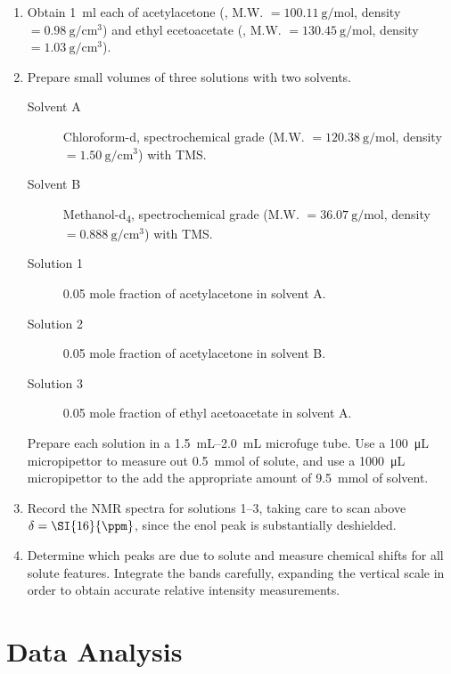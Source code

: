 \documentclass[nobib,nofonts,nols,nohyper,draft]{tufte-handout}
\begin{document}
\begin{enumerate}
	\item Obtain \SI{1}{\ml} each of acetylacetone (, M.W. \( = \SI{100.11}{\g\per\mol} \), density \( = \SI{0.98}{\g\per\cm\cubed} \)) and ethyl ecetoacetate (, M.W. \( = \SI{130.45}{\g\per\mol} \), density \( = \SI{1.03}{\g\per\cm\cubed} \)). 
	\item Prepare small volumes of three solutions with two solvents. 
	\begin{description}
		\item[Solvent A] Chloroform-d, spectrochemical grade (M.W. \( = \SI{120.38}{\g\per\mol} \), density \( = \SI{1.50}{\g\per\cm\cubed} \)) with TMS. 
		\item[Solvent B] Methanol-d\textsubscript{4}, spectrochemical grade (M.W. \( = \SI{36.07}{\g\per\mol} \), density \( = \SI{0.888}{\g\per\cm\cubed} \)) with TMS.
		\item[Solution 1] \num{0.05} mole fraction of acetylacetone in solvent A.
		\item[Solution 2] \num{0.05} mole fraction of acetylacetone in solvent B.
		\item[Solution 3] \num{0.05} mole fraction of ethyl acetoacetate in solvent A.
	\end{description}
	Prepare each solution in a \SIrange{1.5}{2.0}{\mL} microfuge tube. 
	Use a \SI{100}{\uL} micropipettor  to measure out \SI{0.5}{\milli\mole} of solute, and use a \SI{1000}{\uL} micropipettor to the add the appropriate amount of \SI{9.5}{\milli\mole} of solvent. 
	\item Record the NMR spectra for solutions \numrange{1}{3}, taking care to scan above \( \delta = \SI{16}{\ppm} \), since the enol  peak is substantially deshielded. 
	\item Determine which peaks are due to solute and measure chemical shifts for all solute features. Integrate the bands carefully, expanding the vertical scale in order to obtain accurate relative intensity measurements. 
\end{enumerate}


\section{Data Analysis} %
\label{sec:data_analysis}
\end{document}
